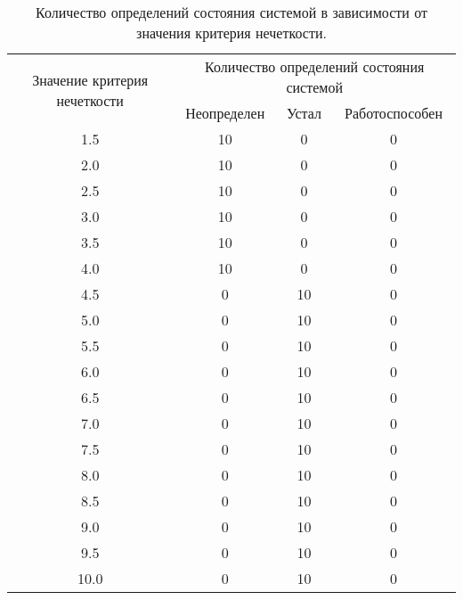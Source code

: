 \begin{table}[H]
	\begin{center}
		\caption{\label{table:time2} Количество определений состояния системой в зависимости от значения критерия нечеткости.}
\begin{tabular}{|c|ccc|}
\hline
\multirow{2}{*}{Значение критерия нечеткости} & \multicolumn{3}{c|}{Количество определений состояния системой}\\ \cline{2-4} & \multicolumn{1}{c|}{Неопределен} & \multicolumn{1}{c|}{Устал} & Работоспособен \\ \hline
1.5& \multicolumn{1}{c|}{10}            & \multicolumn{1}{c|}{0}      &0 \\ \hline
2.0& \multicolumn{1}{c|}{10}            & \multicolumn{1}{c|}{0}     &0 \\ \hline
2.5& \multicolumn{1}{c|}{10}            & \multicolumn{1}{c|}{0}     &0 \\ \hline
3.0& \multicolumn{1}{c|}{10}            & \multicolumn{1}{c|}{0}      &0 \\ \hline
3.5& \multicolumn{1}{c|}{10}            & \multicolumn{1}{c|}{0}      &0 \\ \hline
4.0& \multicolumn{1}{c|}{10}            & \multicolumn{1}{c|}{0}      &0 \\ \hline
4.5& \multicolumn{1}{c|}{0}            & \multicolumn{1}{c|}{10}      &0 \\ \hline
5.0& \multicolumn{1}{c|}{0}            & \multicolumn{1}{c|}{10}      &0 \\ \hline
5.5& \multicolumn{1}{c|}{0}            & \multicolumn{1}{c|}{10}      &0 \\ \hline
6.0& \multicolumn{1}{c|}{0}            & \multicolumn{1}{c|}{10}      &0 \\ \hline
6.5& \multicolumn{1}{c|}{0}            & \multicolumn{1}{c|}{10}      &0 \\ \hline
7.0& \multicolumn{1}{c|}{0}            & \multicolumn{1}{c|}{10}      &0 \\ \hline
7.5& \multicolumn{1}{c|}{0}            & \multicolumn{1}{c|}{10}      &0 \\ \hline
8.0& \multicolumn{1}{c|}{0}            & \multicolumn{1}{c|}{10}      &0 \\ \hline
8.5& \multicolumn{1}{c|}{0}            & \multicolumn{1}{c|}{10}      &0 \\ \hline
9.0& \multicolumn{1}{c|}{0}            & \multicolumn{1}{c|}{10}      &0 \\ \hline
9.5& \multicolumn{1}{c|}{0}            & \multicolumn{1}{c|}{10}      &0 \\ \hline
10.0& \multicolumn{1}{c|}{0}            & \multicolumn{1}{c|}{10}     &0 \\ \hline
\end{tabular}
	\end{center}
\end{table}


